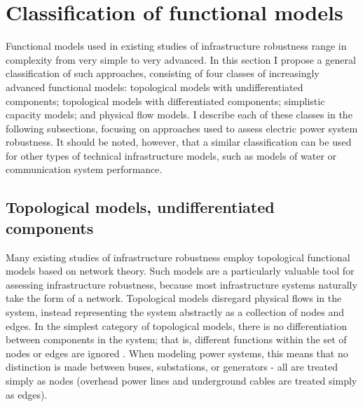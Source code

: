 \section{Classification of functional models}
\label{sec:ch3:models}

Functional models used in existing studies of infrastructure robustness range in complexity from very simple to very advanced. In this section I propose a general classification of such approaches, consisting of four classes of increasingly advanced functional models: topological models with undifferentiated components; topological models with differentiated components; simplistic capacity models; and physical flow models. I describe each of these classes in the following subsections, focusing on approaches used to assess electric power system robustness. It should be noted, however, that a similar classification can be used for other types of technical infrastructure models, such as models of water or communication system performance.


\subsection{Topological models, undifferentiated components}
\label{sec:ch3:models:undiftopo}

Many existing studies of infrastructure robustness employ topological functional models based on network theory.  Such models are a particularly valuable tool for assessing infrastructure robustness, because most infrastructure systems naturally take the form of a network.  Topological models disregard physical flows in the system, instead representing the system abstractly as a collection of nodes and edges.  In the simplest category of topological models, there is no differentiation between components in the system; that is, different functions within the set of nodes or edges are ignored \cite{Holme2002, Motter2002b, Latora2005, Holmgren2006a, Rosas-Casals2007, Winkler2010}.  When modeling power systems, this means that no distinction is made between buses, substations, or generators - all are treated simply as nodes (overhead power lines and underground cables are treated simply as edges).


